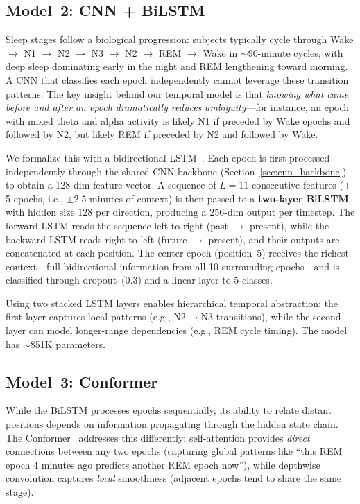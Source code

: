 \documentclass[final]{article}
\begin{document}
\subsection{Model~2: CNN + BiLSTM}
\label{sec:bilstm}

Sleep stages follow a biological progression: subjects typically cycle through Wake $\to$ N1 $\to$ N2 $\to$ N3 $\to$ N2 $\to$ REM $\to$ Wake in $\sim$90-minute cycles, with deep sleep dominating early in the night and REM lengthening toward morning. A CNN that classifies each epoch independently cannot leverage these transition patterns. The key insight behind our temporal model is that \emph{knowing what came before and after an epoch dramatically reduces ambiguity}---for instance, an epoch with mixed theta and alpha activity is likely N1 if preceded by Wake epochs and followed by N2, but likely REM if preceded by N2 and followed by Wake.

We formalize this with a bidirectional LSTM~\cite{Hochreiter1997}. Each epoch is first processed independently through the shared CNN backbone (Section~\ref{sec:cnn_backbone}) to obtain a 128-dim feature vector. A sequence of $L = 11$ consecutive features ($\pm$5 epochs, i.e., $\pm$2.5 minutes of context) is then passed to a \textbf{two-layer BiLSTM} with hidden size 128 per direction, producing a 256-dim output per timestep. The forward LSTM reads the sequence left-to-right (past $\to$ present), while the backward LSTM reads right-to-left (future $\to$ present), and their outputs are concatenated at each position. The center epoch (position~5) receives the richest context---full bidirectional information from all 10 surrounding epochs---and is classified through dropout~(0.3) and a linear layer to 5 classes.

Using two stacked LSTM layers enables hierarchical temporal abstraction: the first layer captures local patterns (e.g., N2$\to$N3 transitions), while the second layer can model longer-range dependencies (e.g., REM cycle timing). The model has $\sim$851K parameters.

\subsection{Model~3: Conformer}
\label{sec:conformer}

While the BiLSTM processes epochs sequentially, its ability to relate distant positions depends on information propagating through the hidden state chain. The Conformer~\cite{Gulati2020} addresses this differently: self-attention provides \emph{direct} connections between any two epochs (capturing global patterns like ``this REM epoch 4 minutes ago predicts another REM epoch now''), while depthwise convolution captures \emph{local} smoothness (adjacent epochs tend to share the same stage).
\end{document}
